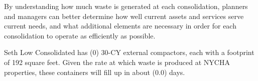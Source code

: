 
    By understanding how much waste is generated at each consolidation, planners and managers
    can better determine how well current assets and services serve current needs, and what additional 
    elements are necessary in order for each consolidation to operate as efficiently as possible. 

    Seth Low Consolidated has (0) 30-CY external compactors, each with a footprint of 192 square feet. Given the rate at which waste is produced at NYCHA properties, these containers will fill
    up in about (0.0) days.